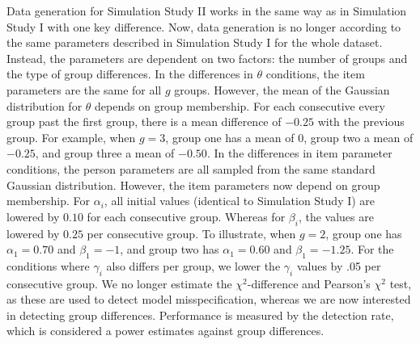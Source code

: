 \documentclass[Royal,sageapa,times,doublespace]{sagej}
\begin{document}
\indent Data generation for Simulation Study II works in the same way as in Simulation Study I with one key difference. Now, data generation is no longer according to the same parameters described in Simulation Study I for the whole dataset. Instead, the parameters are dependent on two factors: the number of groups and the type of group differences. In the differences in $\theta$ conditions, the item parameters are the same for all $g$ groups. However, the mean of the Gaussian distribution for $\theta$ depends on group membership. For each consecutive every group past the first group, there is a mean difference of $-0.25$ with the previous group. For example, when $g = 3$, group one has a mean of 0, group two a mean of $-0.25$, and group three a mean of $-0.50$. In the differences in item parameter conditions, the person parameters are all sampled from the same standard Gaussian distribution. However, the item parameters now depend on group membership. For $\alpha_i$, all initial values (identical to Simulation Study I) are lowered by $0.10$ for each consecutive group. Whereas for $\beta_i$, the values are lowered by $0.25$ per consecutive group. To illustrate, when $g = 2$, group one has $\alpha_1 = 0.70$ and $\beta_1 = -1$, and group two has $\alpha_1 = 0.60$ and $\beta_1 = -1.25$. For the conditions where $\gamma_i$ also differs per group, we lower the $\gamma_i$ values by .05 per consecutive group. We no longer estimate the $\chi^2$-difference and Pearson's $\chi^2$ test, as these are used to detect model misspecification, whereas we are now interested in detecting group differences. Performance is measured by the detection rate, which is considered a power estimates against group differences. \\
\end{document}
